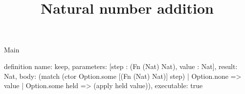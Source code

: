 \begin{lexlean}{Main}
\title{Natural number addition}
\begin{semanticmodule}
definition{
  name: keep,
  parameters: [step : (Fn (Nat) Nat), value : Nat],
  result: Nat,
  body: (match (ctor Option.some [(Fn (Nat) Nat)] step)
    | Option.none => value
    | Option.some held => (apply held value)),
  executable: true
}
\end{semanticmodule}
\end{lexlean}
